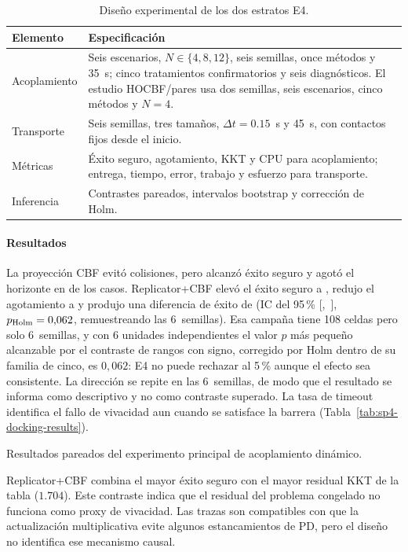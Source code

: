 \begin{table}[!htbp]
  \centering
  \caption{Diseño experimental de los dos estratos E4.}
  \label{tab:sp4-design}
  \viutablefont
  \begin{tabularx}{0.96\textwidth}{>{\raggedright\arraybackslash}p{2.45cm} Y}
    \toprule
    Elemento & Especificación \\
    \midrule
    Acoplamiento & Seis escenarios, $N\in\{4,8,12\}$, seis semillas, once métodos y 35~s; cinco tratamientos confirmatorios y seis diagnósticos. El estudio HOCBF/pares usa dos semillas, seis escenarios, cinco métodos y $N=4$. \\
    Transporte & Seis semillas, tres tamaños, $\Delta t=0.15$~s y 45~s, con contactos fijos desde el inicio. \\
    Métricas & Éxito seguro, agotamiento, KKT y CPU para acoplamiento; entrega, tiempo, error, trabajo y esfuerzo para transporte. \\
    Inferencia & Contrastes pareados, intervalos \mbox{bootstrap} y corrección de Holm. \\
    \bottomrule
  \end{tabularx}
\end{table}

\paragraph{Resultados}

La proyección CBF evitó colisiones, pero alcanzó éxito seguro \SPFourCBFSafe{} y agotó el horizonte en \SPFourCBFTimeout{} de los casos. Replicator+CBF elevó el éxito seguro a \SPFourRepSafe{}, redujo el agotamiento a \SPFourRepTimeout{} y produjo una diferencia de éxito de \SPFourDockEffect{} (IC del 95\,\% [\SPFourDockCILow{},~\SPFourDockCIHigh{}], $p_{\mathrm{Holm}}=0{,}062$, remuestreando las 6~semillas). Esa campaña tiene 108 celdas pero solo 6~semillas, y con 6 unidades independientes el valor $p$ más pequeño alcanzable por el contraste de rangos con signo, corregido por Holm dentro de su familia de cinco, es $0{,}062$: E4 no puede rechazar al 5\,\% aunque el efecto sea consistente. La dirección se repite en las 6~semillas, de modo que el resultado se informa como descriptivo y no como contraste superado. La tasa de timeout identifica el fallo de vivacidad aun cuando se satisface la barrera (Tabla~\ref{tab:sp4-docking-results}).

\begin{table}[!htbp]
  \centering
  \caption{Resultados pareados del experimento principal de acoplamiento dinámico.}
  \label{tab:sp4-docking-results}
  \resizebox{\textwidth}{!}{}
  \viuownsource
\end{table}
Replicator+CBF combina el mayor éxito seguro con el mayor residual KKT de la tabla ($1.704$). Este contraste indica que el residual del problema congelado no funciona como proxy de vivacidad. Las trazas son compatibles con que la actualización multiplicativa evite algunos estancamientos de PD, pero el diseño no identifica ese mecanismo causal.


